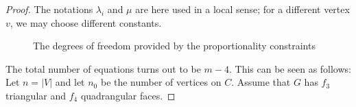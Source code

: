 \begin{proof}
The notations
$\lambda_i$ and 
$\mu$ are here used in a local sense; for a different vertex $v$, we may
choose different constants.
\begin{figure}
     \caption{The degrees of freedom provided by the proportionality constraints}
  \end{figure}
The total number of equations
\thetag{\ref{eq:slope0}--\ref{eq:proportion2}} turns out to be $m-4$.
This can be seen as follows: Let $n=|V|$ and let $n_0$ be the number
of vertices on $C$. Assume that $G$ has $f_3$ triangular and $f_4$
quadrangular faces.


\end{proof}

